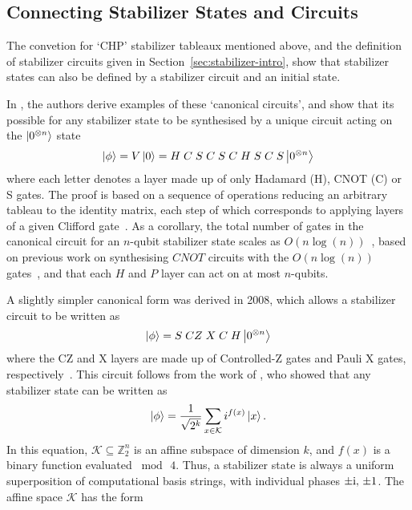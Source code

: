 \subsection{Connecting Stabilizer States and Circuits}
The convetion for `CHP' stabilizer tableaux mentioned above, and the definition of stabilizer circuits given in Section~\ref{sec:stabilizer-intro}, show that stabilizer states can also be defined by a stabilizer circuit and an initial state.\par
In \cite{Aaronson2004}, the authors derive examples of these `canonical circuits', and show that its possible for any stabilizer state to be synthesised by a unique circuit acting on the $\ket{0^{\otimes n}}$ state
\begin{equation}
    \ket{\phi} = V\ket{0} = H\;C\;S\;C\;S\;C \;H \; S \;C \;S \ket{0^{\otimes n}}\label{eq:chpcirc}
\end{equation}
where each letter denotes a layer made up of only Hadamard (H), CNOT (C) or S gates. The proof is based on  a sequence of operations reducing an arbitrary tableau to the identity matrix, each step of which corresponds to applying layers of a given Clifford gate~\cite{Aaronson2004}. As a corollary, the total number of gates in the canonical circuit for an $n$-qubit stabilizer state scales as $O(n\log (n))$~\cite{Aaronson2004}, based on previous work on synthesising $CNOT$ circuits with the $O(n\log (n))$ gates~\cite{Patel2003}, and that each $H$ and $P$ layer can act on at most $n$-qubits.\par
A slightly simpler canonical form was derived in 2008, which allows a stabilizer circuit to be written as
\begin{equation}
    \ket{\phi} = S\;CZ\;X\;C\;H \ket{0^{\otimes n}} \label{eq:affinecirc}
\end{equation}
where the CZ and X layers are made up of Controlled-Z gates and Pauli X gates, respectively~\cite{VandenNest2008}. This circuit follows from the work of \cite{Dehaene2003}, who showed that any stabilizer state can be written as
\begin{equation}
    \ket{\phi} = \frac{1}{\sqrt{2^{k}}}\sum_{x\in\mathcal{K}} i^{f(x)}\ket{x}.\label{eq:affineform}
\end{equation}
In this equation, $\mathcal{K}\subseteq\mathbb{Z}_{2}^{n}$ is an affine subspace of dimension $k$, and $f(x)$ is a binary  function evaluated $\bmod\,4$. Thus, a stabilizer state is always a uniform superposition of computational basis strings, with individual phases $\pm \mathrm{i},\,\pm 1$. The affine space $\mathcal{K}$ has the form
